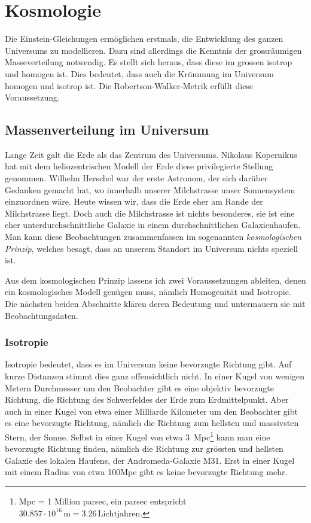%
%
%
\chapter{Kosmologie%
\label{skript:chapter:kosmologie}}
\rhead{}
Die Einstein-Gleichungen ermöglichen erstmals, die Entwicklung
des ganzen Universums zu modellieren.
Dazu sind allerdings die Kenntnis der grossräumigen
Masseverteilung notwendig.
Es stellt sich heraus, dass diese im grossen isotrop und homogen ist.
Dies bedeutet, dass auch die Krümmung im Universum homogen und isotrop
ist.
Die Robertson-Walker-Metrik erfüllt diese Voraussetzung.
%

\section{Massenverteilung im Universum}
Lange Zeit galt die Erde als das Zentrum des Universums.
Nikolaus Kopernikus hat mit dem heliozentrischen Modell der Erde
%
diese privilegierte Stellung genommen.
Wilhelm Herschel war der erste Astronom, der sich darüber Gedanken
gemacht hat, wo innerhalb unserer Milchstrasse unser Sonnensystem
einzuordnen wäre.
Heute wissen wir, dass die Erde eher am Rande der Milchstrasse liegt.
Doch auch die Milchstrasse ist nichts besonderes, sie ist eine eher
unterdurchschnittliche Galaxie in einem durchschnittlichen
Galaxienhaufen.
Man kann diese Beobachtungen zusammenfassen im sogenannten
{\em kosmologischen Prinzip}, welches besagt, dass an unserem
%
Standort im Universum nichts speziell ist.

Aus dem kosmologischen Prinzip lassens ich zwei Voraussetzungen
ableiten, denen ein kosmologisches Modell genügen muss, nämlich
Homogenität und Isotropie.
Die nächsten beiden Abschnitte klären deren Bedeutung und untermauern
sie mit Beobachtungsdaten.

\subsection{Isotropie}
%
Isotropie bedeutet, dass es im Universum keine bevorzugte Richtung
gibt.
Auf kurze Distanzen stimmt dies ganz offensichtlich nicht.
In einer Kugel von wenigen Metern Durchmesser um den Beobachter
gibt es eine objektiv bevorzugte Richtung, die Richtung des Schwerfeldes
der Erde zum Erdmittelpunkt.
Aber auch in einer Kugel von etwa einer Milliarde Kilometer um
den Beobachter gibt es eine bevorzugte Richtung, nämlich die
Richtung zum hellsten und massivsten Stern, der Sonne.
Selbst in einer Kugel von etwa 3~Mpc\footnote{Mpc = 1 Million parsec,
ein parsec entspricht
$30.857\cdot 10^{16}\,\text{m} = 3.26\,\text{Lichtjahren}$.}
kann man eine bevorzugte Richtung finden, nämlich die Richtung zur grössten
und hellsten Galaxie des lokalen Haufens, der Andromeda-Galaxie M31.
%
Erst in einer Kugel mit einem Radius von etwa 100Mpc gibt es keine
bevorzugte Richtung mehr. 

